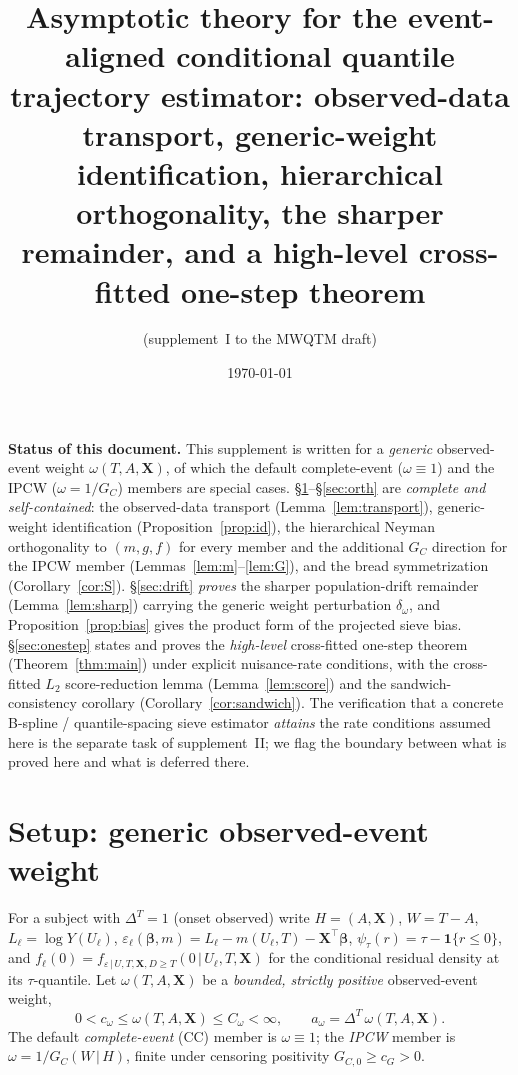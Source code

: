 \documentclass[11pt]{article}
\title{Asymptotic theory for the event-aligned conditional quantile trajectory
estimator: observed-data transport, generic-weight identification, hierarchical
orthogonality, the sharper remainder, and a high-level cross-fitted one-step theorem}
\author{(supplement~I to the MWQTM draft)}
\date{\today}
\theoremstyle{remark}\newtheorem{remark}{Remark}
\newcommand{\X}{\bm{X}}
\newcommand{\bbeta}{\bm{\beta}}
\newcommand{\indc}[1]{\mathbf{1}\{#1\}}
\newcommand{\given}{\,\vert\,}
\begin{document}
\maketitle

\noindent\textbf{Status of this document.} This supplement is written for a
\emph{generic} observed-event weight $\omega(T,A,\X)$, of which the default
complete-event ($\omega\equiv1$) and the IPCW ($\omega=1/G_C$) members are
special cases. \S\ref{sec:setup}--\S\ref{sec:orth} are \emph{complete and
self-contained}: the observed-data transport (Lemma~\ref{lem:transport}),
generic-weight identification (Proposition~\ref{prop:id}), the hierarchical
Neyman orthogonality to $(m,g,f)$ for every member and the additional $G_C$
direction for the IPCW member (Lemmas~\ref{lem:m}--\ref{lem:G}), and the bread
symmetrization (Corollary~\ref{cor:S}). \S\ref{sec:drift} \emph{proves} the
sharper population-drift remainder (Lemma~\ref{lem:sharp}) carrying the generic
weight perturbation $\delta_\omega$, and Proposition~\ref{prop:bias} gives the
product form of the projected sieve bias. \S\ref{sec:onestep} states and proves
the \emph{high-level} cross-fitted one-step theorem (Theorem~\ref{thm:main})
under explicit nuisance-rate conditions, with the cross-fitted $L_2$
score-reduction lemma (Lemma~\ref{lem:score}) and the sandwich-consistency
corollary (Corollary~\ref{cor:sandwich}). The verification that a concrete
B-spline / quantile-spacing sieve estimator \emph{attains} the rate conditions
assumed here is the separate task of supplement~II; we flag the boundary between
what is proved here and what is deferred there.

\section{Setup: generic observed-event weight}\label{sec:setup}
For a subject with $\Delta^T=1$ (onset observed) write $H=(A,\X)$, $W=T-A$,
$L_\ell=\log Y(U_\ell)$, $\varepsilon_\ell(\bbeta,m)=L_\ell-m(U_\ell,T)
-\X^\top\bbeta$, $\psi_\tau(r)=\tau-\indc{r\le0}$, and
$f_\ell(0)=f_{\varepsilon\given U,T,\X,D\ge T}(0\given U_\ell,T,\X)$ for the
conditional residual density at its $\tau$-quantile. Let $\omega(T,A,\X)$ be a
\emph{bounded, strictly positive} observed-event weight,
\begin{equation}
0<c_\omega\le\omega(T,A,\X)\le C_\omega<\infty,\qquad
a_\omega=\Delta^T\,\omega(T,A,\X).
\label{eq:omega}
\end{equation}
The default \emph{complete-event} (CC) member is $\omega\equiv1$; the
\emph{IPCW} member is $\omega=1/G_C(W\given H)$, finite under censoring
positivity $G_{C,0}\ge c_G>0$.
\end{document}
